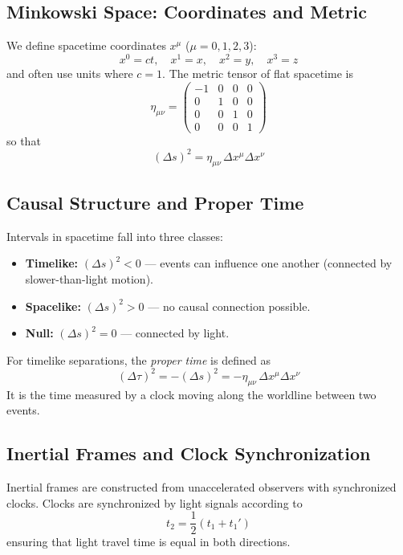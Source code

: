 \documentclass[11pt, a4paper]{report}
\begin{document}
\subsection*{Minkowski Space: Coordinates and Metric}
We define spacetime coordinates $x^\mu$ ($\mu = 0,1,2,3$):
\[
x^0 = ct, \quad x^1 = x, \quad x^2 = y, \quad x^3 = z
\]
and often use units where $c = 1$.
The metric tensor of flat spacetime is
\begin{equation}\label{eq:minkowski-metric}
\eta_{\mu\nu} =
\begin{pmatrix}
-1 & 0 & 0 & 0\\
0 & 1 & 0 & 0\\
0 & 0 & 1 & 0\\
0 & 0 & 0 & 1
\end{pmatrix}
\end{equation}
so that
\[
(\Delta s)^2 = \eta_{\mu\nu} \, \Delta x^\mu \Delta x^\nu
\]
\subsection*{Causal Structure and Proper Time}

Intervals in spacetime fall into three classes:

\begin{itemize}
    \item \textbf{Timelike:} $(\Delta s)^2 < 0$ — events can influence one another (connected by slower-than-light motion).
    \item \textbf{Spacelike:} $(\Delta s)^2 > 0$ — no causal connection possible.
    \item \textbf{Null:} $(\Delta s)^2 = 0$ — connected by light.
\end{itemize}

For timelike separations, the \emph{proper time} is defined as
\begin{equation}\label{eq:proper-time}
(\Delta \tau)^2 = -(\Delta s)^2 = -\eta_{\mu\nu} \, \Delta x^\mu \Delta x^\nu
\end{equation}
It is the time measured by a clock moving along the worldline between two events.

\subsection*{Inertial Frames and Clock Synchronization}

Inertial frames are constructed from unaccelerated observers with synchronized clocks.  
Clocks are synchronized by light signals according to
\[
t_2 = \frac{1}{2}(t_1 + t_1')
\]
ensuring that light travel time is equal in both directions.
\end{document}

